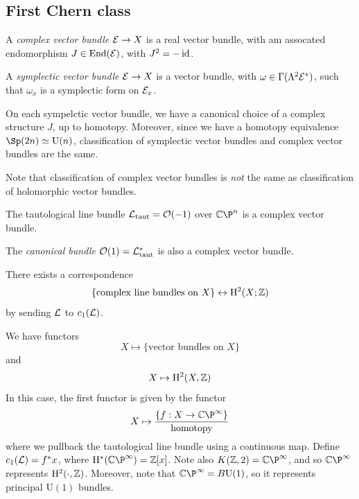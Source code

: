 \documentclass{article}
\begin{document}
\subsection{First Chern class}

\begin{definition}
    A \emph{complex vector bundle} \(\mathcal{E} \to X\) is a real vector bundle, with am assocated endomorphism \(J \in \operatorname{End}(\mathcal{E})\), with \(J^2 = -\operatorname{id}\).
\end{definition}

\begin{definition}
    A \emph{symplectic vector bundle} \(\mathcal{E} \to X\) is a vector bundle, with \(\omega \in \Gamma(\Lambda^2\mathcal{E}^*)\), such that \(\omega_x\) is a symplectic form on \(\mathcal{E}_x\).
\end{definition}

On each sympelctic vector bundle, we have a canonical choice of a complex structure \(J\), up to homotopy. Moreover, since we have a homotopy equivalence \(\Sp(2n) \simeq \mathrm{U}(n)\), classification of symplectic vector bundles and complex vector bundles are the same.

\begin{remark}
    Note that classification of complex vector bundles is \emph{not} the same as classification of holomorphic vector bundles.
\end{remark}

\begin{example}
    The tautological line bundle \(\mathcal{L}_{\mathrm{taut}} = \mathcal{O}(-1)\) over \(\C\P^n\) is a complex vector bundle.

    The \emph{canonical bundle} \(\mathcal{O}(1) = \mathcal{L}_{\mathrm{taut}}^*\) is also a complex vector bundle.
\end{example}

\begin{theorem}
    There exists a correspondence
    \[\{\text{complex line bundles on }X\} \leftrightarrow \mathrm{H}^2(X; \mathbb{Z})\]
    by sending \(\mathcal{L}\) to \(c_1(\mathcal{L})\).
\end{theorem}

\lec

We have functors
\[X \mapsto \{\text{vector bundles on }X\}\]
and
\[X \mapsto \mathrm{H}^2(X, \mathbb{Z})\]
In this case, the first functor is given by the functor
\[X \mapsto \frac{\{f : X \to \C\P^\infty\}}{\text{homotopy}}\]
where we pullback the tautological line bundle using a continuous map. Define \(c_1(\mathcal{L}) = f^*x\), where \(\HH^*(\C\P^\infty) = \Z[x]\). Note also \(K(\Z, 2) = \C\P^\infty\), and so \(\C\P^\infty\) represents \(\mathrm{H}^2(\cdot, \mathbb{Z})\). Moreover, note that \(\C\P^\infty = B\mathrm U(1)\), so it represents principal \(\mathrm U(1)\) bundles.
\end{document}
